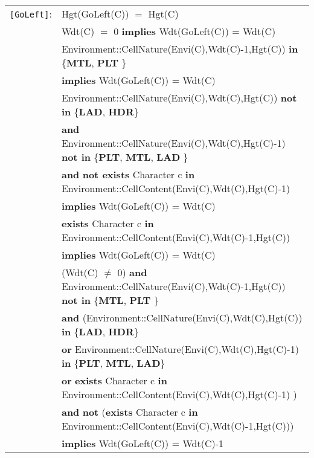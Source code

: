 \documentclass{article}
\begin{document}
\begin{tabular}{rl}
\texttt{[GoLeft]}: 
& \textrm{Hgt(GoLeft(C))} $=$ \textrm{Hgt(C)} \\
& \textrm{Wdt(C)} $=$ 0 \textbf{implies} \textrm{Wdt(GoLeft(C))} = \textrm{Wdt(C)} \\
& \textrm{Environment::CellNature(Envi(C),Wdt(C)-1,Hgt(C))} \textbf{in} \{\textbf{MTL}, \textbf{PLT} \} \\
& \quad \textbf{implies} \textrm{Wdt(GoLeft(C))} = \textrm{Wdt(C)} \\
& \textrm{Environment::CellNature(Envi(C),Wdt(C),Hgt(C))} \textbf{not in} \{\textbf{LAD}, \textbf{HDR}\}
\\ & \quad\quad \textbf{and} \textrm{Environment::CellNature(Envi(C),Wdt(C),Hgt(C)-1)} \textbf{not in} \{\textbf{PLT}, \textbf{MTL}, \textbf{LAD} \} \\
& \quad\quad \textbf{and} \textbf{not exists} \textrm{Character} c \textbf{in} \textrm{Environment::CellContent(Envi(C),Wdt(C),Hgt(C)-1)} \\
& \quad\quad \textbf{implies} \textrm{Wdt(GoLeft(C))} = \textrm{Wdt(C)} \\
& \textbf{exists} \textrm{Character} c \textbf{in} \textrm{Environment::CellContent(Envi(C),Wdt(C)-1,Hgt(C))} \\ & \quad\quad \textbf{implies} \textrm{Wdt(GoLeft(C))} = \textrm{Wdt(C)} \\
& (\textrm{Wdt(C)} $\neq$ 0) \textbf{and} \textrm{Environment::CellNature(Envi(C),Wdt(C)-1,Hgt(C))} \textbf{not in} \{\textbf{MTL}, \textbf{PLT} \} \\
& \quad\quad \textbf{and} (\textrm{Environment::CellNature(Envi(C),Wdt(C),Hgt(C))} \textbf{in} \{\textbf{LAD}, \textbf{HDR}\} \\
& \quad\quad\quad\quad \textbf{or} \textrm{Environment::CellNature(Envi(C),Wdt(C),Hgt(C)-1)} \textbf{in} \{\textbf{PLT}, \textbf{MTL}, \textbf{LAD}\} \\
& \quad\quad\quad\quad \textbf{or} \textbf{exists} \textrm{Character} c \textbf{in} \textrm{Environment::CellContent(Envi(C),Wdt(C),Hgt(C)-1)} ) \\
& \quad\quad \textbf{and} \textbf{not} (\textbf{exists} \textrm{Character} c \textbf{in} \textrm{Environment::CellContent(Envi(C),Wdt(C)-1,Hgt(C))}) \\
& \quad\quad \textbf{implies} \textrm{Wdt(GoLeft(C))} = \textrm{Wdt(C)}-1  \\


\end{tabular}
\end{document}
